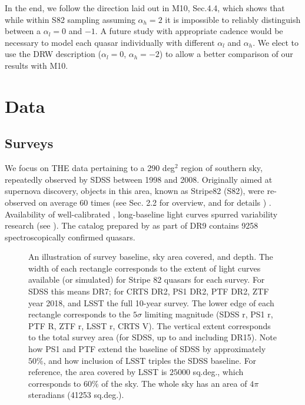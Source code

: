 \documentclass[twocolumn]{aastex62}
\begin{document}
In the end, we follow the direction laid out in M10, Sec.4.4, which shows that while within S82 sampling assuming $\alpha_{h}= 2 $ it is impossible to reliably distinguish between a $\alpha_{l}=0$ and $-1$. A future study with appropriate cadence would be necessary to model each quasar individually with different $\alpha_{l}$ and $\alpha_{h}$. We elect to use the DRW description ($\alpha_{l}=0$, $\alpha_{h}=-2$) to allow a better comparison of our results with M10. 

%
%
%
%
%

\section{Data}\label{sec:data}
\subsection{Surveys}
We focus on THE data pertaining to a 290 deg$^{2}$ region of southern sky, repeatedly observed by SDSS between 1998 and 2008. Originally aimed at supernova discovery, objects in this area, known as Stripe82 (S82), were  re-observed on average 60 times (see \citealt{macleod2012} Sec. 2.2 for overview, and \citealt{annis2014} for details ) . Availability of well-calibrated \citep{ivezic2007}, long-baseline light curves spurred variability research (see \citealt{sesar2007}). The catalog prepared by \citep{schneider2008} as part of DR9  contains 9258 spectroscopically confirmed quasars.  


\begin{figure*}
\caption{An illustration of survey baseline, sky area covered, and depth. The width of each rectangle corresponds to the extent of light curves available (or simulated) for Stripe 82 quasars for each survey. For SDSS this means DR7; for CRTS DR2, PS1 DR2, PTF DR2, ZTF year 2018, and LSST the full 10-year survey. The lower edge of each rectangle corresponds to the $5\sigma$ limiting magnitude (SDSS r, PS1 r, PTF R, ZTF r, LSST r, CRTS V). The vertical extent corresponds to the total survey area (for SDSS, up to and including DR15).  Note how PS1 and PTF extend the baseline of SDSS by approximately $50\%$, and how inclusion of LSST triples the SDSS baseline. For reference, the area covered by LSST is $25 000$ sq.deg., which corresponds to  $60\%$ of the sky. The whole sky has an area of $4\pi$ steradians (41253 sq.deg.).}
\label{fig:lcExtent}
\end{figure*} 
\end{document}

